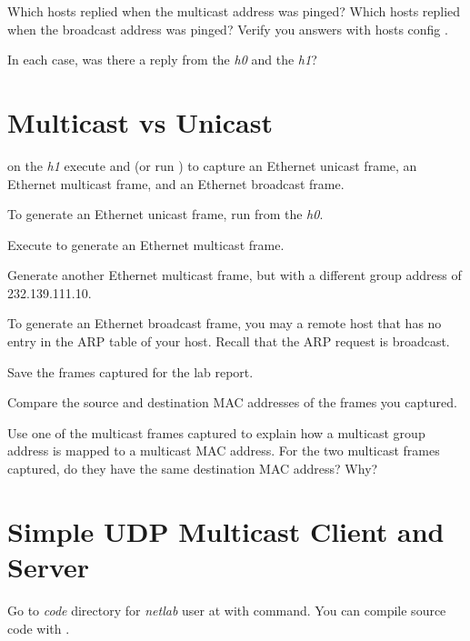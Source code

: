 \documentclass{../UTNetLab}
\begin{document}
\begin{report}
    \item Which hosts replied when the multicast address was pinged?
    Which hosts replied when the broadcast address was pinged?
    Verify you answers with hosts config .

    \item In each case, was there a reply from the \textit{h0} and the \textit{h1}?
\end{report}

\section{Multicast vs Unicast}
on the \textit{h1} execute  and  (or run ) to capture an Ethernet unicast frame, an Ethernet multicast frame, and an Ethernet broadcast frame.

To generate an Ethernet unicast frame, run  from the \textit{h0}.

Execute  to generate an Ethernet multicast frame.

Generate another Ethernet multicast frame, but with a different group address of {232.139.111.10}.

To generate an Ethernet broadcast frame, you may  a remote host that has no entry in the ARP table of your host.
Recall that the ARP request is broadcast.

Save the frames captured for the lab report.

\begin{report}
    \item Compare the source and destination MAC addresses of the frames you captured.

    \item Use one of the multicast frames captured to explain how a multicast group address is mapped to a multicast MAC address.
    For the two multicast frames captured, do they have the same destination MAC address?
    Why?
\end{report}

\section{Simple UDP Multicast Client and Server}
Go to \textit{code} directory for \textit{netlab} user at  with  command.
You can compile source code with .
\end{document}
